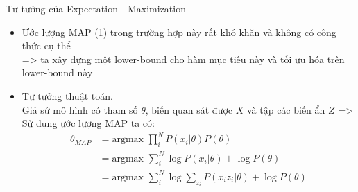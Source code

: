 \documentclass[pdf]{beamer}
\begin{document}
\begin{frame}{Tư tưởng của Expectation - Maximization}
\begin{itemize}
	\item Ước lượng MAP (1) trong trường hợp này rất khó khăn và không có công thức cụ thể \\
	=>  ta xây dựng một lower-bound cho hàm mục tiêu này và tối ưu hóa trên lower-bound này
	\item Tư tưởng thuật toán. \\
	Giả sử mô hình có tham số $\theta$, biến quan sát được $X$ và tập các biến ẩn $Z$
	=> Sử dụng ước lượng MAP ta có:
	\begin{align}
	\theta_{MAP} & = \text{argmax } \prod_{i}^{N} P(x_{i}|\theta)P(\theta) \nonumber \\
	& = \text{argmax } \sum_{i}^{N} \log P(x_{i}|\theta) + \log P(\theta ) \nonumber  \\
	& = \text{argmax } \sum_{i}^{N} \log \sum_{z_{i}} P(x_{i}z_{i}|\theta) + \log P(\theta ) \label{eq:MAP}
	\end{align}
\end{itemize}


\end{frame}
\end{document}
